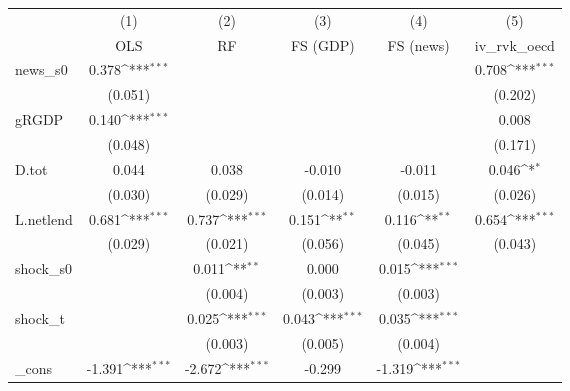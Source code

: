 {
\def\sym#1{\ifmmode^{#1}\else\(^{#1}\)\fi}
\begin{tabular}{l*{5}{c}}
\toprule
            &\multicolumn{1}{c}{(1)}&\multicolumn{1}{c}{(2)}&\multicolumn{1}{c}{(3)}&\multicolumn{1}{c}{(4)}&\multicolumn{1}{c}{(5)}\\
            &\multicolumn{1}{c}{OLS}&\multicolumn{1}{c}{RF}&\multicolumn{1}{c}{FS (GDP)}&\multicolumn{1}{c}{FS (news)}&\multicolumn{1}{c}{iv\_rvk\_oecd}\\
\midrule
news\_s0     &       0.378\sym{***}&                     &                     &                     &       0.708\sym{***}\\
            &     (0.051)         &                     &                     &                     &     (0.202)         \\
\addlinespace
gRGDP       &       0.140\sym{***}&                     &                     &                     &       0.008         \\
            &     (0.048)         &                     &                     &                     &     (0.171)         \\
\addlinespace
D.tot       &       0.044         &       0.038         &      -0.010         &      -0.011         &       0.046\sym{*}  \\
            &     (0.030)         &     (0.029)         &     (0.014)         &     (0.015)         &     (0.026)         \\
\addlinespace
L.netlend   &       0.681\sym{***}&       0.737\sym{***}&       0.151\sym{**} &       0.116\sym{**} &       0.654\sym{***}\\
            &     (0.029)         &     (0.021)         &     (0.056)         &     (0.045)         &     (0.043)         \\
\addlinespace
shock\_s0    &                     &       0.011\sym{**} &       0.000         &       0.015\sym{***}&                     \\
            &                     &     (0.004)         &     (0.003)         &     (0.003)         &                     \\
\addlinespace
shock\_t     &                     &       0.025\sym{***}&       0.043\sym{***}&       0.035\sym{***}&                     \\
            &                     &     (0.003)         &     (0.005)         &     (0.004)         &                     \\
\addlinespace
\_cons      &      -1.391\sym{***}&      -2.672\sym{***}&      -0.299         &      -1.319\sym{***}&                     \\

\end{tabular}}
